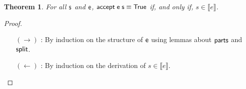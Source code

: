 \documentclass[oneside,12pt]{scrbook}
\newtheorem{Theorem}{Theorem}
\theoremstyle{definition}
\newcommand{\C}[1]{\red{\mathsf{#1}}}
\newcommand{\F}[1]{\green{\mathsf{#1}}}
\newcommand{\V}[1]{\black{\mathsf{#1}}}
\newcommand{\sembrackets}[1]{\ensuremath{\llbracket #1 \rrbracket}}
\theoremstyle{plain}
\theoremstyle{definition}
\begin{document}
\begin{Theorem}
	For all \ensuremath{\V{s}} and \ensuremath{\V{e}}, \ensuremath{\F{accept}\;\V{e}\;\V{s}\equiv \C{True}} if, and only if, $s\in\sembrackets{e}$.
\end{Theorem}
\begin{proof}
	$\,$\\
	\begin{itemize}
		\item[$(\to)$]: By induction on the structure of \ensuremath{\V{e}} using lemmas about \ensuremath{\F{parts}} and \ensuremath{\F{split}}.
		\item[$(\leftarrow)$]: By induction on the derivation of $s \in\sembrackets{e}$.
	\end{itemize}
\end{proof}
\end{document}
